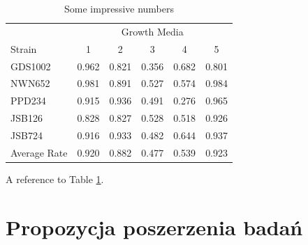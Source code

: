 \documentclass[peerreview]{IEEEtran}
\begin{document}
\begin{table} %
\centering %
\begin{tabular}{l c c c c c} %
\toprule %
& \multicolumn{5}{c}{Growth Media} \\ %
\cmidrule(l){2-6} %
Strain & 1 & 2 & 3 & 4 & 5\\ %
\midrule %
GDS1002 & 0.962 & 0.821 & 0.356 & 0.682 & 0.801\\ %
NWN652 & 0.981 & 0.891 & 0.527 & 0.574 & 0.984\\ %
PPD234 & 0.915 & 0.936 & 0.491 & 0.276 & 0.965\\ %
JSB126 & 0.828 & 0.827 & 0.528 & 0.518 & 0.926\\ %
JSB724 & 0.916 & 0.933 & 0.482 & 0.644 & 0.937\\ %
\midrule %
\midrule %
Average Rate & 0.920 & 0.882 & 0.477 & 0.539 & 0.923\\ %
\bottomrule %
\end{tabular}
\smallskip 
\caption{Some impressive numbers} %
\label{tab:template} %
\end{table}
A reference to Table \ref{tab:template}.

\section{Propozycja poszerzenia badań}
\end{document}
